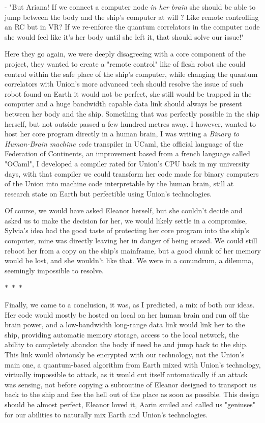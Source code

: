 \documentclass[colorlinks,12pt,a4paper]{book}
\newcommand\sep{\begin{center}
  \boldmath $\ast$~$\ast$~$\ast$
\end{center}}
\begin{document}
 - "But Ariana! If we connect a computer node \textit{in her brain} she should be able to jump between the body and the ship's computer at will ? 
 Like remote controlling an RC but in VR? If we re-enforce the quantum correlators in the computer node she would feel like it's her body until she left it,
 that should solve our issue!"\par
 \bigskip
 
 Here they go again, we were deeply disagreeing with a core component of the project, they wanted to create a "remote control" like of flesh robot she could 
 control within the safe place of the ship's computer, while changing the quantum correlators with Union's more advanced tech should resolve the issue of such robot 
 found on Earth it would not be perfect, she still would be trapped in the computer and a huge bandwidth capable data link should always be present between her 
 body and the ship. Something that was perfectly possible in the ship herself, but not outside passed a few hundred metres away. I however, wanted to host her 
 core program directly in a human brain, I was writing a \textit{Binary to Human-Brain machine code} transpiler in UCaml, the official language of the 
 Federation of Continents, an improvement based from a french language called "OCaml", I developed a compiler rated for Union's CPU back in my university days,
 with that compiler we could transform her code made for binary computers of the Union into machine code interpretable by the human brain, still at 
 research state on Earth but perfectible using Union's technologies.\par 
 \bigskip 
 
 Of course, we would have asked Eleanor herself, but she couldn't decide and asked us to make the decision for her, we would likely settle in a compromise, 
 Sylvia's idea had the good taste of protecting her core program into the ship's computer, mine was directly leaving her in danger of being erased. We could 
 still reboot her from a copy on the ship's mainframe, but a good chunk of her memory would be lost, and she wouldn't like that. We were in a conundrum, a dilemma,
 seemingly impossible to resolve.
 
 \sep 
 
 Finally, we came to a conclusion, it was, as I predicted, a mix of both our ideas. Her code would mostly be hosted on local on her human brain and run off the brain 
 power, and a low-bandwidth long-range data link would link her to the ship, providing automatic memory storage, access to the local network, the ability to completely 
 abandon the body if need be and jump back to the ship. This link would obviously be encrypted with our technology, not the Union's main one, a quantum-based algorithm from 
 Earth mixed with Union's technology, virtually impossible to attack, as it would cut itself automatically if an attack was sensing, not before copying a subroutine 
 of Eleanor designed to transport us back to the ship and flee the hell out of the place as soon as possible. This design should be almost perfect, Eleanor loved it,
 Aarin smiled and called us "geniuses" for our abilities to naturally mix Earth and Union's technologies.\par 
 \bigskip 
 
\end{document}
